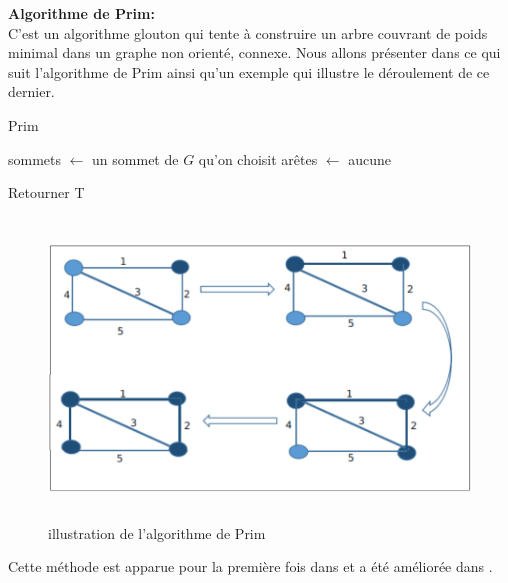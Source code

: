 \textbf{Algorithme de Prim:}\\
C’est un algorithme  glouton qui tente à construire un arbre couvrant de poids minimal dans un graphe non orienté, connexe. Nous allons présenter dans ce qui suit l’algorithme de Prim ainsi qu’un exemple qui illustre le déroulement de ce dernier.\\

\begin{algorithm}[H]
\label{alg3:prim}
\caption{Prim}
\SetAlgoLined
\DontPrintSemicolon
\large


sommets $\gets$ un sommet de $G$ qu’on choisit \;
arêtes $\gets$ aucune 

Retourner T \;
\end{algorithm}

\begin{figure}[H]
	\centering
	\includegraphics[width=15cm,height=8cm]{Chap3/3.png}
	\caption{illustration de l’algorithme de Prim}
	\label{fig:33}
\end{figure}


Cette méthode est apparue pour la première fois dans \cite{shin2010approximation,zhang2008new} et a été améliorée dans \cite{sundar2013new}.

